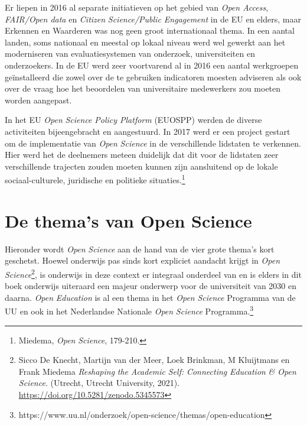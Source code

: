 \documentclass[smallauthor, chapterhaspagenum, nochapterinheader, pagenuminheader,  bigchapnum,medium2, tocpages,  garamond, titleinheader]{jote-book}
\begin{document}
	Er liepen in 2016 al separate initiatieven op het gebied van \emph{Open Access},\emph{ FAIR/Open data} en \emph{Citizen}\emph{ }\emph{Science}\emph{/Public Engagement} in de EU en elders, maar Erkennen en Waarderen was nog geen groot internationaal thema. In een aantal landen, soms nationaal en meestal op lokaal niveau werd wel gewerkt aan het moderniseren van evaluatiesystemen van onderzoek, universiteiten en onderzoekers. In de EU werd zeer voortvarend al in 2016 een aantal werkgroepen geïnstalleerd die zowel over de te gebruiken indicatoren moesten adviseren als ook over de vraag hoe het beoordelen van universitaire medewerkers zou moeten worden aangepast.



	In het EU \emph{Open }\emph{Science} \emph{Policy Platform} (EUOSPP) werden de diverse activiteiten bijeengebracht en aangestuurd. In 2017 werd er een project gestart om de implementatie van \emph{Open }\emph{Science} in de verschillende lidstaten te verkennen. Hier werd het de deelnemers meteen duidelijk dat dit voor de lidstaten zeer verschillende trajecten zouden moeten kunnen zijn aansluitend op de lokale sociaal-culturele, juridische en politieke situaties.\footnote{Miedema, \emph{Open }\emph{Science}, 179-210.}



	\section{De thema's van Open Science}



	Hieronder wordt \emph{Open }\emph{Science} aan de hand van de vier grote thema's kort geschetst. Hoewel onderwijs pas sinds kort expliciet aandacht krijgt in \emph{Open }\emph{Science}\footnote{Sicco De Knecht, Martijn van der Meer, Loek Brinkman, M Kluijtmans en Frank Miedema \emph{Reshaping}\emph{ }\emph{the}\emph{ }\emph{Academic}\emph{ }\emph{Self}\emph{: }\emph{Connecting}\emph{ }\emph{Education}\emph{ \& Open }\emph{Science}. (Utrecht, Utrecht University, 2021). \href{https://doi.org/10.5281/zenodo.5345573}{https://doi.org/10.5281/zenodo.5345573}}, is onderwijs in deze context er integraal onderdeel van en is elders in dit boek onderwijs uiteraard een majeur onderwerp voor de universiteit van 2030 en daarna. \emph{Open }\emph{Education} is al een thema in het \emph{Open }\emph{Science} Programma van de UU en ook in het Nederlandse Nationale \emph{Open }\emph{Science} Programma.\footnote{https://www.uu.nl/onderzoek/open-science/themas/open-education}
\end{document}
